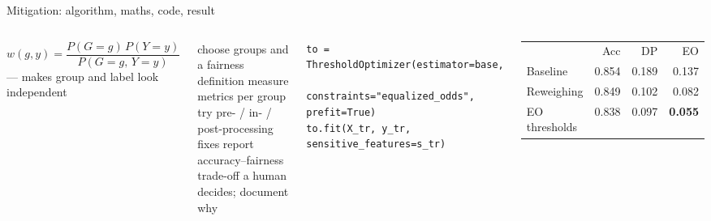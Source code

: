 \documentclass[aspectratio=169,11pt]{beamer}
\begin{document}
\begin{frame}[fragile]{Mitigation: algorithm, maths, code, result}
\begin{columns}[T]
\begin{bmath}
$w(g,y)=\dfrac{P(G=g)\,P(Y=y)}{P(G=g,\,Y=y)}$ --- makes group and label look independent
\end{bmath}
\begin{balgo}
\begin{algorithmic}[1]
\State choose groups and a fairness definition
\State measure metrics per group
\State try pre- / in- / post-processing fixes
\State report accuracy--fairness trade-off
\State a human decides; document why
\end{algorithmic}
\end{balgo}
\begin{bcode}
\begin{lstlisting}
to = ThresholdOptimizer(estimator=base,
       constraints="equalized_odds", prefit=True)
to.fit(X_tr, y_tr, sensitive_features=s_tr)
\end{lstlisting}
\end{bcode}
\begin{bres}
\begin{tabular}{lrrr}
 & Acc & DP & EO\\
Baseline & 0.854 & 0.189 & 0.137\\
Reweighing & 0.849 & 0.102 & 0.082\\
EO thresholds & 0.838 & 0.097 & \textbf{0.055}\\
\end{tabular}
\end{bres}
\end{columns}
\end{frame}
\end{document}
